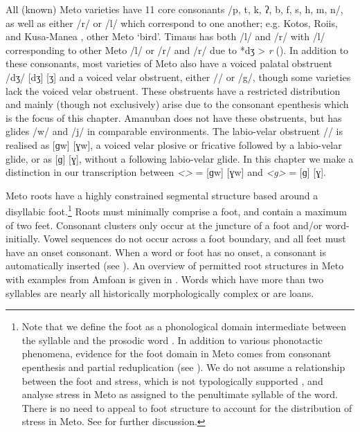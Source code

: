 \documentclass[output=paper]{langscibook}
\begin{document}
All (known) Meto varieties have
11 core consonants /p, t, k, ʔ, b, f, s, h, m, n/, as well as either /r/ or /l/
which correspond to one another;
e.g. Kotos, Roi{\Q}is, and Kusa-Manea , other Meto  `bird'.
Timaus has both /l/ and /r/ with /l/
corresponding to other Meto /l/ or /r/
and /r/ due to *{dʒ} > \textit{r} ().
In addition to these consonants, most varieties of Meto also have
a voiced palatal obstruent /dʒ/ [dʒ] {\tl} [ʒ]  and a voiced
velar obstruent, either /\gw/ or /g/,
though some varieties lack the voiced velar obstruent.
These obstruents have a restricted distribution
and mainly (though not exclusively) arise due to
the consonant epenthesis which is the focus of this chapter.
Amanuban does not have these obstruents,
but has glides /w/ and /j/ in comparable environments.
The labio-velar obstruent /{\gw}/ is realised
as [ɡw] {\tl} [ɣw], a voiced velar plosive or fricative followed by a labio-velar glide,
or as [ɡ] {\tl} [ɣ], without a following labio-velar glide.
In this chapter we make a distinction in our transcription between 
\textit{<\gw>} = [ɡw] {\tl} [ɣw] and \textit{<g>} = [ɡ] {\tl} [ɣ].

Meto roots have a highly constrained
segmental structure based around a disyllabic foot.\footnote{%
Note that we define the foot as a phonological domain intermediate between the syllable and the
prosodic word \citep{cu22}. In addition to various phonotactic phenomena,
evidence for the foot domain in Meto comes from consonant epenthesis and 
partial reduplication (see \citealt{cu-PhD}). 
We do not assume a relationship 
between the foot and stress, which is not typologically supported \citep{cu22}, and analyse stress in Meto as assigned to the penultimate syllable of the word. There 
is no need to appeal to foot structure to account for the distribution of stress in Meto. See \citet{cu-PhD} for further discussion.} Roots must minimally comprise a foot, and contain a maximum
of two feet. 
Consonant clusters only occur at the juncture of a foot and/or word-initially.
Vowel sequences do not occur across a foot boundary, and all feet
must have an onset consonant. When a word or foot has no onset,
a consonant is automatically inserted (see ). 
An overview of permitted root structures in Meto with examples 
from Amfo{\Q}an is given in .
Words which have more than two syllables are nearly
all historically morphologically complex or are loans.
\end{document}
